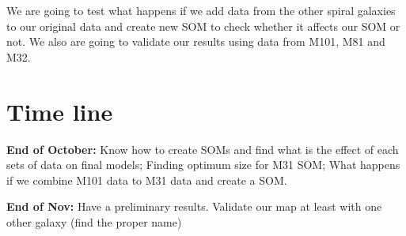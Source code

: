 \documentclass{article}
\begin{document}
We are going to test what happens if we add data from the other spiral galaxies to our original data and create new SOM to check whether it affects our SOM or not. We also are going to validate our results using data from M101, M81 and M32.

\section*{Time line}

\textbf{End of October:} Know how to create SOMs and find what is the effect of each sets of data on final models; Finding optimum size for M31 SOM; What happens if we combine M101 data to M31 data and create a SOM.

\textbf{End of Nov:} Have a preliminary results. Validate our map at least with one other galaxy (find the proper name)
\end{document}
